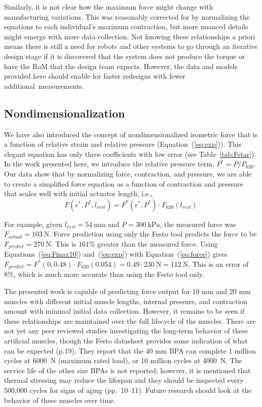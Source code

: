 \documentclass[actuators,article,accept,pdftex,moreauthors]{Definitions/mdpi}
\begin{document}
Similarly, it is not clear how the maximum force might change with manufacturing variations. This was reasonably corrected for by normalizing the equations to each individual's maximum contraction, but more nuanced details might emerge with more data collection. Not knowing these relationships a priori means there is still a need for robots and other systems to go through an iterative design stage if it is discovered that the system does not produce the torque or have the RoM that the design team expects. However, the data and models provided here should enable for faster redesigns with fewer \mbox{additional measurements.}

\subsection{Nondimensionalization}

We have also introduced the concept of nondimensionalized isometric force that is a function of relative strain and relative pressure (Equation~(\ref{eq:exp})). This elegant equation has only three coefficients with low error (see Table~\ref{tab:Fstar}). In the work presented here, we introduce the relative pressure term, $P^*=P/P_{620}$. Our data show that by normalizing force, contraction, and pressure, we are able to create a simplified force equation as a function of contraction and pressure that scales well with initial actuator length, i.e.,
 \begin{equation}
   F(\epsilon^*,P^*,l_{rest}) = F^*(\epsilon^*,P^*) \cdot F_{620}(l_{rest}) \label{eq:force}
\end{equation}

For example, given $l_{rest}=\qty{54}{\mm}$ and $P=\qty{300}{\kPa}$, the measured force was \mbox{$F_{actual} = \qty{103}{\N}$.} Force prediction using only the Festo tool predicts the force to be \mbox{$F_{predict} = \qty{270}{\N}$.} This is $161\%$ greater than the measured force. Using Equations~(\ref{eq:Fmax10}) and~(\ref{eq:exp}) with Equation~(\ref{eq:force}) gives $F_{predict} = F^*(0, 0.48) \cdot F_{620}(0.054) = 0.49 \cdot \qty{230}{\N} = \qty{112}{\N}$. This is an error of $8\%$, which is much more accurate than using the Festo tool only.

The presented work is capable of predicting force output for 10 mm and 20 mm muscles with different initial muscle lengths, internal pressure, and contraction amount with minimal initial data collection. However, it remains to be seen if these relationships are maintained over the full lifecycle of the muscles. There are not yet any peer reviewed studies investigating the long-term behavior of these artificial muscles, though the Festo datasheet provides some indication of what can be expected \citep{festo_2026} (p.19). They report that the 40 mm BPA can complete 1 million cycles at \qty{6000}{\N} (maximum rated load), or 10 million cycles at \qty{4000}{\N}. The service life of the other size BPAs is not reported; however, it is mentioned that thermal stressing may reduce the lifespan and they should be inspected every 500,000 cycles for signs of aging \citep{festo_2018} (pp.~10--11). Future research should look at the behavior of these muscles over time.
\end{document}

